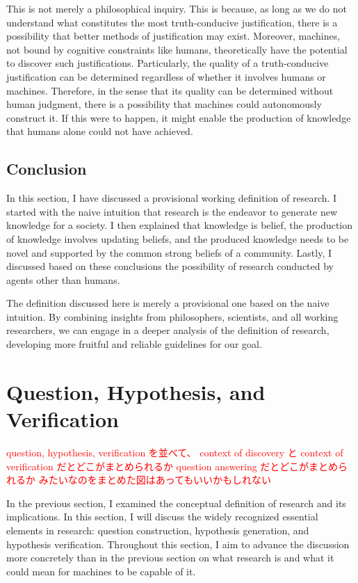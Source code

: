 This is not merely a philosophical inquiry. This is because, as long as we do not understand what constitutes the most truth-conducive justification, there is a possibility that better methods of justification may exist. Moreover, machines, not bound by cognitive constraints like humans, theoretically have the potential to discover such justifications. Particularly, the quality of a truth-conducive justification can be determined regardless of whether it involves humans or machines. Therefore, in the sense that its quality can be determined without human judgment, there is a possibility that machines could autonomously construct it. If this were to happen, it might enable the production of knowledge that humans alone could not have achieved.

\subsection{Conclusion}
In this section, I have discussed a provisional working definition of research. I started with the naive intuition that research is the endeavor to generate new knowledge for a society. I then explained that knowledge is belief, the production of knowledge involves updating beliefs, and the produced knowledge needs to be novel and supported by the common strong beliefs of a community. Lastly, I discussed based on these conclusions the possibility of research conducted by agents other than humans.

The definition discussed here is merely a provisional one based on the naive intuition. By combining insights from philosophers, scientists, and all working researchers, we can engage in a deeper analysis of the definition of research, developing more fruitful and reliable guidelines for our goal.

\section{Question, Hypothesis, and  Verification}

\label{section-question-hypothesis-verification}

\textcolor{red}{question, hypothesis, verification を並べて、
context of discovery と context of verification だとどこがまとめられるか
question answering だとどこがまとめられるか
みたいなのをまとめた図はあってもいいかもしれない}

In the previous section, I examined the conceptual definition of research and its implications. In this section, I will discuss the widely recognized essential elements in research: question construction, hypothesis generation, and hypothesis verification. Throughout this section, I aim to advance the discussion more concretely than in the previous section on what research is and what it could mean for machines to be capable of it.

